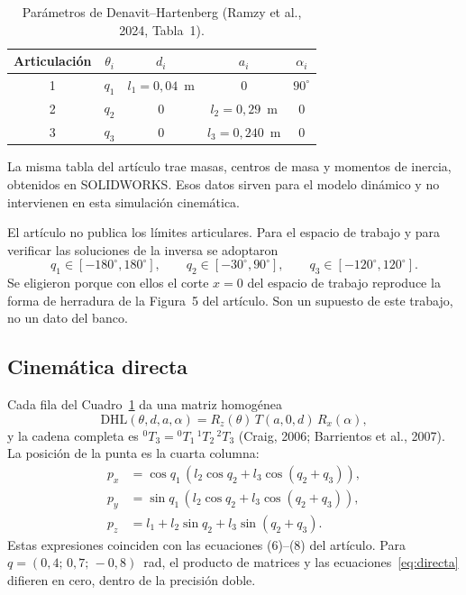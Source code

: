 \documentclass[11pt,a4paper]{article}
\newcommand{\DHL}{\ensuremath{\mathrm{DHL}}}
\begin{document}
\begin{table}[ht]
\centering
\caption{Parámetros de Denavit--Hartenberg (Ramzy et al., 2024, Tabla~1).}
\label{tab:dh}
\begin{tabular}{@{}ccccc@{}}
\toprule
Articulación & \(\theta_i\) & \(d_i\) & \(a_i\) & \(\alpha_i\) \\
\midrule
1 & \(q_1\) & \(l_1=0{,}04\)~m & 0 & \(90^\circ\) \\
2 & \(q_2\) & 0 & \(l_2=0{,}29\)~m & 0 \\
3 & \(q_3\) & 0 & \(l_3=0{,}240\)~m & 0 \\
\bottomrule
\end{tabular}
\end{table}

La misma tabla del artículo trae masas, centros de masa y momentos de inercia, obtenidos en SOLIDWORKS. Esos datos sirven para el modelo dinámico y no intervienen en esta simulación cinemática.

El artículo no publica los límites articulares. Para el espacio de trabajo y para verificar las soluciones de la inversa se adoptaron
\begin{equation}
q_1\in[-180^\circ,180^\circ],\qquad q_2\in[-30^\circ,90^\circ],\qquad q_3\in[-120^\circ,120^\circ].
\end{equation}
Se eligieron porque con ellos el corte \(x=0\) del espacio de trabajo reproduce la forma de herradura de la Figura~5 del artículo. Son un supuesto de este trabajo, no un dato del banco.

\subsection{Cinemática directa}

Cada fila del Cuadro~\ref{tab:dh} da una matriz homogénea
\begin{equation}
\DHL(\theta,d,a,\alpha)=R_z(\theta)\,T(a,0,d)\,R_x(\alpha),
\end{equation}
y la cadena completa es \({}^{0}T_{3}={}^{0}T_{1}\,{}^{1}T_{2}\,{}^{2}T_{3}\) (Craig, 2006; Barrientos et al., 2007). La posición de la punta es la cuarta columna:
\begin{equation}
\begin{aligned}
p_x &= \cos q_1\,(l_2\cos q_2+l_3\cos(q_2+q_3)),\\
p_y &= \sin q_1\,(l_2\cos q_2+l_3\cos(q_2+q_3)),\\
p_z &= l_1+l_2\sin q_2+l_3\sin(q_2+q_3).
\end{aligned}
\label{eq:directa}
\end{equation}
Estas expresiones coinciden con las ecuaciones (6)--(8) del artículo. Para \(q=(0{,}4;\,0{,}7;\,-0{,}8)\)~rad, el producto de matrices y las ecuaciones~\eqref{eq:directa} difieren en cero, dentro de la precisión doble.
\end{document}
